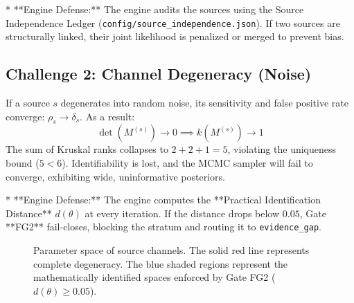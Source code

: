 \documentclass[11pt,a4paper]{article}
\begin{document}
* **Engine Defense:** The engine audits the sources using the Source Independence Ledger (\texttt{config/source\_independence.json}). If two sources are structurally linked, their joint likelihood is penalized or merged to prevent bias.

\subsection{Challenge 2: Channel Degeneracy (Noise)}
If a source $s$ degenerates into random noise, its sensitivity and false positive rate converge: $\rho_s \to \delta_s$. As a result:
\[
\det(M^{(s)}) \to 0 \implies k(M^{(s)}) \to 1
\]
The sum of Kruskal ranks collapses to $2 + 2 + 1 = 5$, violating the uniqueness bound ($5 < 6$). Identifiability is lost, and the MCMC sampler will fail to converge, exhibiting wide, uninformative posteriors.

* **Engine Defense:** The engine computes the **Practical Identification Distance** $d(\theta)$ at every iteration. If the distance drops below $0.05$, Gate **FG2** fail-closes, blocking the stratum and routing it to \texttt{evidence\_gap}.

\begin{figure}[h]
\centering
{}
\caption{Parameter space of source channels. The solid red line represents complete degeneracy. The blue shaded regions represent the mathematically identified spaces enforced by Gate FG2 ($d(\theta) \ge 0.05$).}
\label{fig:parameter_space}
\end{figure}
\end{document}
